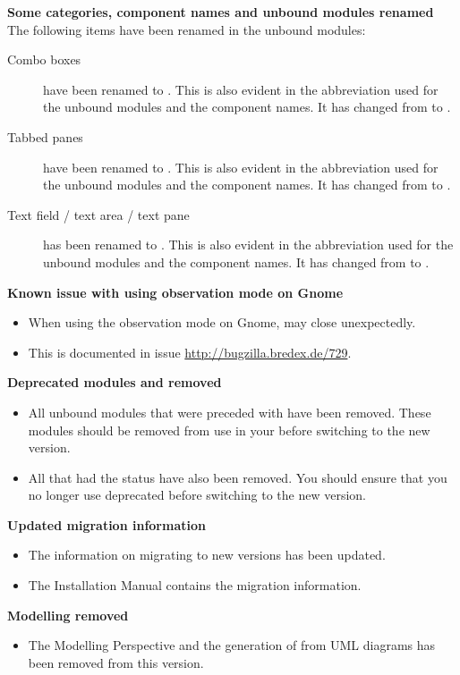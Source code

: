 \textbf{Some categories, component names and unbound modules renamed}
The following items have been renamed in the unbound modules:
\begin{description}
\item [Combo boxes]{ have been renamed to . This is also evident in the abbreviation used for the unbound modules and the component names. It has changed from  to .}
\item [Tabbed panes]{ have been renamed to . This is also evident in the abbreviation used for the unbound modules and the component names. It has changed from  to .}
\item [Text field / text area / text pane]{ has been renamed to . This is also evident in the abbreviation used for the unbound modules and the component names. It has changed from  to .}
\end{description}

\textbf{Known issue with using observation mode on Gnome}
\begin{itemize}
\item When using the observation mode on Gnome, \app{} may close unexpectedly. 
\item This is documented in issue \url{http://bugzilla.bredex.de/729}.
\end{itemize}

\textbf{Deprecated modules and \gdsteps{} removed}
\begin{itemize}
\item All unbound modules that were preceded with  have been removed. These modules should be removed from use in your \gdprojects{} before switching to the new version. 
\item All \gdsteps{} that had the status  have also been removed. You should ensure that you no longer use deprecated \gdsteps{} before switching to the new version. 
\end{itemize}

\textbf{Updated migration information}
\begin{itemize}
\item The information on migrating to new versions has been updated.
\item The Installation Manual contains the migration information. 
\end{itemize}

\textbf{Modelling removed}
\begin{itemize}
\item The Modelling Perspective and the generation of \gdcases{} from UML diagrams has been removed from this version.
\end{itemize}
